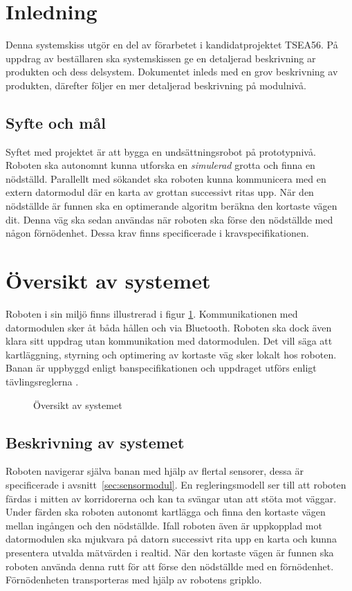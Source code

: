 \documentclass[11pt]{article}
\begin{document}
\begin{flushleft}

\section{Inledning}
Denna systemskiss utgör en del av förarbetet i kandidatprojektet TSEA56. På uppdrag av beställaren ska systemskissen ge en detaljerad beskrivning ar produkten och dess delsystem. Dokumentet inleds med en grov beskrivning av produkten, därefter följer en mer detaljerad beskrivning på modulnivå.
\subsection{Syfte och mål}
Syftet med projektet är att bygga en undsättningsrobot på prototypnivå. Roboten ska autonomnt kunna utforska en \textit{simulerad} grotta och finna en nödställd. Parallellt med sökandet ska roboten kunna kommunicera med en extern datormodul där en karta av grottan successivt ritas upp. När den nödställde är funnen ska en optimerande algoritm beräkna den kortaste vägen dit. Denna väg ska sedan användas när roboten ska förse den nödställde med någon förnödenhet. Dessa krav finns specificerade i kravspecifikationen.\cite{krav}

\pagebreak
\section{Översikt av systemet}
Roboten i sin miljö finns illustrerad i figur \ref{system}. Kommunikationen med datormodulen sker åt båda hållen och via Bluetooth\textsuperscript{\circledR}. Roboten ska dock även klara sitt uppdrag utan kommunikation med datormodulen. Det vill säga att kartläggning, styrning och optimering av kortaste väg sker lokalt hos roboten. Banan är uppbyggd enligt banspecifikationen \cite{banspec} och uppdraget utförs enligt tävlingsreglerna \cite{tavling}.
\begin{figure}[htbp]
\centering
\noindent\resizebox{.8\linewidth}{!}{
	}
	\caption{Översikt av systemet \label{system}}	
\end{figure}


\subsection{Beskrivning av systemet}
Roboten navigerar själva banan med hjälp av flertal sensorer, dessa är specificerade i \mbox{avsnitt \ref{sec:sensormodul}}. En regleringsmodell ser till att roboten färdas i mitten av korridorerna och kan ta svängar utan att stöta mot väggar. Under färden ska roboten autonomt kartlägga och finna den kortaste vägen mellan ingången och den nödställde. Ifall roboten även är uppkopplad mot datormodulen ska mjukvara på datorn successivt rita upp en karta och kunna presentera utvalda mätvärden i realtid. När den kortaste vägen är funnen ska roboten använda denna rutt för att förse den nödställde med en förnödenhet. Förnödenheten transporteras med hjälp av robotens gripklo.


\end{flushleft}
\end{document}
